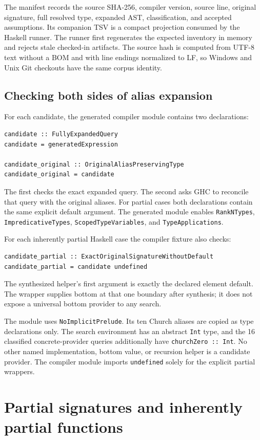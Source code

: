 \documentclass[11pt]{article}
\newcommand{\code}[1]{\texttt{#1}}
\begin{document}
The manifest records the source SHA-256, compiler version, source line,
original signature, full resolved type, expanded AST, classification, and
accepted assumptions. Its companion TSV is a compact projection consumed by
the Haskell runner. The runner first regenerates the expected inventory in
memory and rejects stale checked-in artifacts.
The source hash is computed from UTF-8 text without a BOM and with line
endings normalized to LF, so Windows and Unix Git checkouts have the same
corpus identity.

\subsection{Checking both sides of alias expansion}

For each candidate, the generated compiler module contains two declarations:
\begin{lstlisting}
candidate :: FullyExpandedQuery
candidate = generatedExpression

candidate_original :: OriginalAliasPreservingType
candidate_original = candidate
\end{lstlisting}
The first checks the exact expanded query. The second asks GHC to reconcile
that query with the original aliases. For partial cases both declarations
contain the same explicit default argument. The generated module enables
\code{RankNTypes}, \code{ImpredicativeTypes},
\code{ScopedTypeVariables}, and \code{TypeApplications}.

For each inherently partial Haskell case the compiler fixture also checks:
\begin{lstlisting}
candidate_partial :: ExactOriginalSignatureWithoutDefault
candidate_partial = candidate undefined
\end{lstlisting}
The synthesized helper's first argument is exactly the declared element
default. The wrapper supplies bottom at that one boundary after synthesis;
it does not expose a universal bottom provider to any search.

The module uses \code{NoImplicitPrelude}. Its ten Church aliases are copied as
type declarations only. The search environment has an abstract \code{Int}
type, and the 16 classified concrete-provider queries additionally have
\code{churchZero :: Int}. No other named implementation, bottom value, or
recursion helper is a candidate provider. The compiler module imports
\code{undefined} solely for the explicit partial wrappers.

\section{Partial signatures and inherently partial functions}
\end{document}
